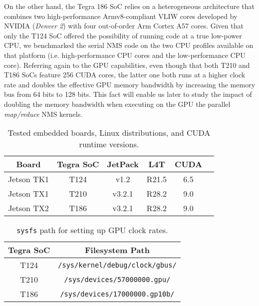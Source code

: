 On the other hand, the Tegra 186 SoC relies on a heterogeneous architecture that combines two high-performance Armv8-compliant VLIW cores 
developed by NVIDIA (\emph{Denver 2}) with four out-of-order Arm Cortex A57 cores. Given that only the T124 SoC offered the possibility of 
running code at a true low-power CPU, we benchmarked the serial NMS code on the two CPU profiles available on that platform (i.e. 
high-performance CPU cores and the low-performance CPU core). Referring again to the GPU capabilities, even though that both T210 and T186 SoCs feature 256 CUDA cores, the latter one 
both runs at a higher clock rate and doubles the effective GPU memory bandwidth by increasing the memory bus from 64 bits to 128 bits. This fact 
will enable us later to study the impact of doubling the memory bandwidth when executing on the GPU the parallel \emph{map/reduce} NMS kernels.

 \begin{table}
  \renewcommand{\arraystretch}{1.3}
  \caption{Tested embedded boards, Linux distributions, and CUDA runtime versions.}
  \centering
  \footnotesize
  \begin{tabular}{| c | c | c | c | c | c |}
  \hline
  \textbf{Board} & \textbf{Tegra SoC} & \textbf{JetPack} & \textbf{L4T} & \textbf{CUDA} \\
  \hline
  Jetson TK1 & T124 & v1.2 & R21.5 & 6.5 \\
  Jetson TX1 & T210 & v3.2.1 & R28.2 & 9.0 \\
  Jetson TX2 & T186 & v3.2.1 & R28.2 & 9.0 \\
  \hline
  \end{tabular}
  \normalsize
  \label{tab:jetsondistros}
 \end{table}

 \begin{table}
  \renewcommand{\arraystretch}{1.3}
  \caption{\texttt{sysfs} path for setting up GPU clock rates.}
  \centering
  \footnotesize
  \begin{tabular}{| c | c |}
  \hline
  \textbf{Tegra SoC} & \textbf{Filesystem Path} \\
  \hline
  T124 & \texttt{/sys/kernel/debug/clock/gbus/} \\
  T210 & \texttt{/sys/devices/57000000.gpu/} \\
  T186 & \texttt{/sys/devices/17000000.gp10b/} \\
  \hline
  \end{tabular}
  \normalsize
  \label{tab:tegrafs}
 \end{table}

